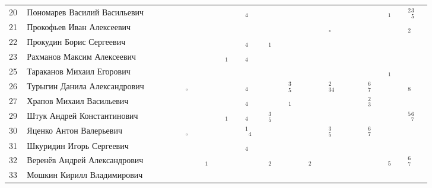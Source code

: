 \documentclass[a4paper,landscape,11pt]{article}
\newcommand*\Ok{&\small \ding{51}$\!\!_\circ$} %
\newcommand*\ok{&{\small \ding{51}}} %
\newcommand*\no{&{\small }} %
\newcommand*\da{&{\small\ding{48}$\!\!_1$}} %
\newcommand*\ad{&{\small${}^1\!\!$\ding{48}$\!\!_4$}} %
\newcommand*\bc{&{\small\ding{48}$\!\!^2_3$}} %
\newcommand*\db{&{\small\ding{48}$\!\!_2$}} %
\newcommand*\dd{&{\small\ding{48}$\!\!_4$}} %
\newcommand*\bd{&{\small\ding{48}$\!\!^2_{34}$}} %
\newcommand*\de{&{\small\ding{48}$\!\!_5$}} %
\newcommand*\fg{&{\small\ding{48}$\!\!^6_7$}} %
\newcommand*\dH{&{\small\ding{48}$\!\!_8$}} %
\newcommand*\ce{&{\small\ding{48}$\!\!^3_5$}} %
\newcommand*\cde{&{\small ${}^2\!\!$\ding{48}$\!\!^{3}_{5}$}} %
\newcommand*\efg{&{\small ${}^5\!\!$\ding{48}$\!\!^{6}_{7}$}} %
\begin{document}
\begin{tabular}{p{7pt}|l|p{6pt}p{6pt}p{6pt}p{6pt}p{6pt}p{6pt}p{6pt}p{6pt}p{6pt}p{6pt}p{6pt}p{6pt}p{6pt}p{6pt}p{6pt}p{6pt}p{6pt}p{6pt}p{6pt}p{6pt}p{6pt}p{6pt}p{6pt}p{6pt}p{6pt}p{6pt}p{6pt}p{6pt}}
\midrule
20\,&Пономарев Василий Васильевич	\ok\ok\ok\ok\ok\no\ok\ok\no\ok\dd\ok\no\ok\no\ok\no\ok\no\ok\no\ok\no\ok\da\ok\cde\\
21\,&Прокофьев Иван Алексеевич		\ok\ok\ok\ok\ok\no\ok\ok\ok\ok\ok\ok\ok\no\ok\no\no\no\Ok\no\ok\ok\ok\no\ok\ok\db\\ 
22\,&Прокудин Борис Сергеевич		\ok\ok\ok\ok\ok\ok\ok\ok\ok\ok\dd\ok\da\ok\ok\ok\ok\ok\ok\ok\ok\ok\ok\ok\ok\ok\ok\\
23\,&Рахманов Максим Алексеевич		\ok\ok\ok\ok\ok\ok\ok\ok\da\ok\dd\ok\ok\ok\ok\ok\no\ok\ok\ok\ok\ok\no\ok\ok\ok\no\\
25\,&Тараканов Михаил Егорович		\ok\ok\ok\ok\ok\ok\no\ok\ok\ok\ok\no\no\ok\ok\ok\no\ok\ok\ok\ok\ok\ok\no\da\no\no\\
26\,&Турыгин Данила Александрович	\ok\ok\ok\ok\Ok\ok\ok\ok\ok\ok\dd\ok\ok\ok\ce\ok\ok\ok\bd\ok\no\ok\fg\no\ok\ok\dH\\
27\,&Храпов Михаил Васильевич		\ok\ok\ok\ok\no\no\ok\ok\ok\ok\dd\ok\ok\ok\da\ok\ok\no\ok\ok\ok\ok\bc\ok\ok\ok\no\\
\midrule
29\,&Штук Андрей Константинович		\ok\ok\ok\ok\ok\ok\no\ok\da\ok\dd\ok\ce\ok\ok\ok\ok\ok\ok\ok\no\ok\ok\ok\ok\ok\efg\\
30\,&Яценко Антон Валерьевич		\ok\ok\ok\ok\Ok\no\ok\no\ok\ok\ad\no\no\no\ok\ok\ok\ok\ce\ok\no\no\fg\no\ok\no\ok\\
31\,&Шкуридин Игорь Сергеевич		\ok\no\ok\ok\ok\ok\ok\ok\no\ok\dd\no\no\no\ok\ok\no\ok\ok\ok\no\no\no\no\no\no\no\\
32\,&Веренёв Андрей Александрович	\ok\ok\ok\ok\ok\ok\da\no\ok\ok\ok\ok\db\ok\ok\ok\db\ok\ok\ok\ok\ok\ok\ok\de\ok\fg\\
33\,&Мошкин Кирилл Владимирович		\ok\ok\ok\ok\ok\ok\no\ok\ok\ok\\
\bottomrule
\end{tabular} 
\end{document}
